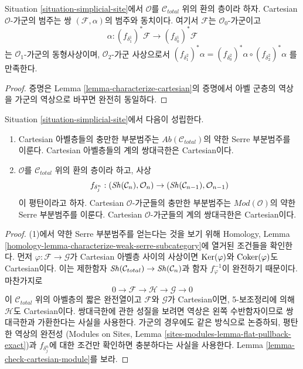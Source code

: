 \begin{lemma}
\label{lemma-characterize-cartesian-modules}
Situation \ref{situation-simplicial-site}에서
$\mathcal{O}$를 $\mathcal{C}_{total}$ 위의 환의 층이라 하자.
Cartesian $\mathcal{O}$-가군의 범주는 쌍
$(\mathcal{F}, \alpha)$의 범주와 동치이다.
여기서 $\mathcal{F}$는 $\mathcal{O}_0$-가군이고
$$
\alpha :
(f_{\delta_1^1})^*\mathcal{F}
\longrightarrow (f_{\delta_0^1})^*\mathcal{F}
$$
는 $\mathcal{O}_1$-가군의 동형사상이며,
$\mathcal{O}_2$-가군 사상으로서
$(f_{\delta^2_1})^*\alpha =
(f_{\delta^2_0})^*\alpha \circ (f_{\delta^2_2})^*\alpha$
를 만족한다.
\end{lemma}

\begin{proof}
증명은 Lemma \ref{lemma-characterize-cartesian}의 증명에서
아벨 군층의 역상을 가군의 역상으로 바꾸면 완전히 동일하다.
\end{proof}

\begin{lemma}
\label{lemma-Serre-subcat-cartesian-modules}
Situation \ref{situation-simplicial-site}에서 다음이 성립한다.
\begin{enumerate}
\item Cartesian 아벨층들의 충만한 부분범주는
$\textit{Ab}(\mathcal{C}_{total})$의 약한 Serre 부분범주를 이룬다.
Cartesian 아벨층들의 계의 쌍대극한은 Cartesian이다.
\item $\mathcal{O}$를 $\mathcal{C}_{total}$ 위의 환의 층이라 하고,
사상
$$
f_{\delta^n_j} : (\mathop{\mathit{Sh}}\nolimits(\mathcal{C}_n), \mathcal{O}_n)
\to (\mathop{\mathit{Sh}}\nolimits(\mathcal{C}_{n - 1}), \mathcal{O}_{n - 1})
$$
이 평탄이라고 하자. Cartesian $\mathcal{O}$-가군들의 충만한 부분범주는
$\textit{Mod}(\mathcal{O})$의 약한 Serre 부분범주를 이룬다.
Cartesian $\mathcal{O}$-가군들의 계의 쌍대극한은 Cartesian이다.
\end{enumerate}
\end{lemma}

\begin{proof}
(1)에서 약한 Serre 부분범주를 얻는다는 것을 보기 위해
Homology, Lemma
\ref{homology-lemma-characterize-weak-serre-subcategory}에 열거된 조건들을
확인한다. 먼저 $\varphi : \mathcal{F} \to \mathcal{G}$가
Cartesian 아벨층 사이의 사상이면
$\mathop{\mathrm{Ker}}(\varphi)$와 $\mathop{\mathrm{Coker}}(\varphi)$도 Cartesian이다.
이는 제한함자
$\mathop{\mathit{Sh}}\nolimits(\mathcal{C}_{total}) \to \mathop{\mathit{Sh}}\nolimits(\mathcal{C}_n)$과
함자 $f_\varphi^{-1}$이 완전하기 때문이다. 마찬가지로
$$
0 \to \mathcal{F} \to \mathcal{H} \to \mathcal{G} \to 0
$$
이 $\mathcal{C}_{total}$ 위의 아벨층의 짧은 완전열이고
$\mathcal{F}$와 $\mathcal{G}$가 Cartesian이면,
5-보조정리에 의해 $\mathcal{H}$도 Cartesian이다.
쌍대극한에 관한 성질을 보려면 역상은 왼쪽 수반함자이므로
쌍대극한과 가환한다는 사실을 사용한다.
가군의 경우에도 같은 방식으로 논증하되, 평탄한 역상의 완전성
(Modules on Sites, Lemma \ref{sites-modules-lemma-flat-pullback-exact})과
$f_{\delta^n_j}$에 대한 조건만 확인하면 충분하다는 사실을 사용한다.
Lemma \ref{lemma-check-cartesian-module}를 보라.
\end{proof}

